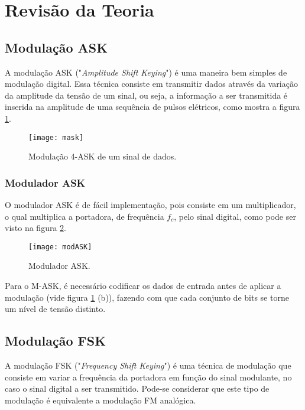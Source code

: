 \newpage
\section{Revisão da Teoria}

\subsection{Modulação ASK}

A modulação ASK ("\emph{Amplitude Shift Keying}") é uma maneira bem simples de modulação digital. Essa técnica consiste em transmitir dados através da variação da amplitude da tensão de um sinal, ou seja, a informação a ser transmitida é inserida na amplitude de uma sequência de pulsos elétricos, como mostra a figura \ref{fig:mask}. 

\begin{figure}[H]
    \centering
    \texttt{[image: mask]}
    \caption{Modulação 4-ASK de um sinal de dados.}
    \label{fig:mask}
\end{figure}

\subsubsection{Modulador ASK}
O modulador ASK é de fácil implementação, pois consiste em um multiplicador, o qual multiplica a portadora, de frequência $f_c$, pelo sinal digital, como pode ser visto na figura \ref{fig:modASK}.

\begin{figure}[H]
    \centering
    \texttt{[image: modASK]}
    \caption{Modulador ASK.}
    \label{fig:modASK}
\end{figure}

Para o M-ASK, é necessário codificar os dados de entrada antes de aplicar a modulação (vide figura \ref{fig:mask} (b)), fazendo com que cada conjunto de bits se torne um nível de tensão distinto.
 
\subsection{Modulação FSK}

A modulação FSK ("\emph{Frequency Shift Keying}") é uma técnica de modulação que consiste em variar a frequência da portadora em função do sinal modulante, no caso o sinal digital a ser transmitido.
Pode-se considerar que este tipo de modulação é equivalente a modulação FM analógica.

